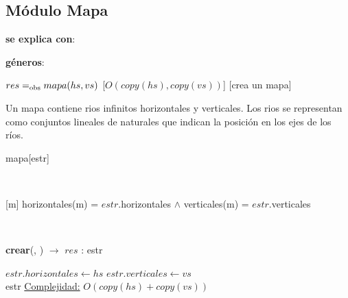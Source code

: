 \subsection{Módulo Mapa}

\begin{Interfaz}
  
  \textbf{se explica con}: 

  \textbf{géneros}: 


  {$res =_{\mathrm{obs}} mapa(hs, vs)$}%
    [$O(copy(hs), copy(vs))$]
  [crea un mapa]

\end{Interfaz}

\begin{Representacion}
  

  Un mapa contiene rios infinitos horizontales y verticales. Los rios se
  representan como conjuntos lineales de naturales que indican la posición en
  los ejes de los ríos.

  \begin{Estructura}{mapa}[estr]
    \begin{Tupla}[estr]
    \end{Tupla}

  \end{Estructura}
  

    ~ 

  [m]{
      horizontales(m) = $estr$.horizontales $\land$ 
      verticales(m) = $estr$.verticales
  }

\end{Representacion}

~

\begin{Algoritmos}

\begin{algorithm}[H]{\textbf{crear}(, ) $\to$ $res$ : estr}
\begin{algorithmic}[1]
    \State $estr.horizontales \gets hs$
    \State $estr.verticales \gets vs$\\
    \Return estr
    \medskip
    \Statex \underline{Complejidad:} $O(copy(hs) + copy(vs))$
\end{algorithmic}
\end{algorithm}
  
\end{Algoritmos}


